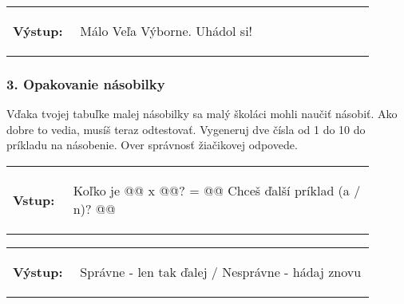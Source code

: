 \vspace{-2em}
\begin{tabular}{@{}p{0.15\linewidth}p{0.75\linewidth}}
\textbf{\small Výstup:} &
\vspace{-3em}
\begin{code}
Málo
Veľa
Výborne. Uhádol si!
\end{code}
\end{tabular}
\vspace{-2em}

\subsubsection*{3. Opakovanie násobilky}
Vďaka tvojej tabuľke malej násobilky sa malý školáci mohli naučiť násobiť. Ako dobre to vedia, musíš teraz odtestovať. Vygeneruj dve čísla od 1 do 10 do príkladu na násobenie. Over správnosť žiačikovej odpovede.

\begin{tabular}{@{}p{0.15\linewidth}p{0.75\linewidth}}
\textbf{\small Vstup:} &
\vspace{-3em}
\begin{code}
Koľko je @\fbox{\phantom{vstup}}@ x @\fbox{\phantom{vstup}}@?
= @\fbox{\phantom{vstup}}@
Chceš ďalší príklad (a / n)?  @\fbox{\phantom{vstup}}@
\end{code}
\end{tabular}

\vspace{-2em}
\begin{tabular}{@{}p{0.15\linewidth}p{0.75\linewidth}}
\textbf{\small Výstup:} &
\vspace{-3em}
\begin{code}
Správne - len tak ďalej / Nesprávne - hádaj znovu
\end{code}
\end{tabular}
\vspace{-2em}
